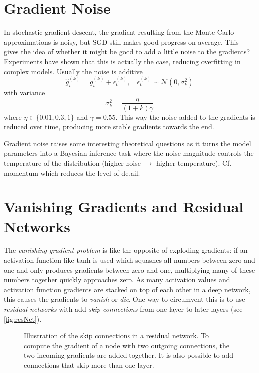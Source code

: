 	\section{Gradient Noise}
		In stochastic gradient descent, the gradient resulting from the Monte Carlo approximations is noisy, but SGD still makes good progress on average. This gives the idea of whether it might be good to add a little noise to the gradients? Experiments have shown that this is actually the case, reducing overfitting in complex models. Usually the noise is additive
		\begin{equation}
			\hat{g}_i^{(k)} = g_i^{(k)} + \epsilon_t^{(k)},\quad \epsilon_t^{(k)} \sim \mathcal{N}(0, \sigma_k^2)
		\end{equation}
		with variance
		\begin{equation}
			\sigma_k^2 = \frac{\eta}{(1 + k) \gamma}
		\end{equation}
		where \( \eta \in \{ 0.01, 0.3, 1 \} \) and \( \gamma = 0.55 \). This way the noise added to the gradients is reduced over time, producing more stable gradients towards the end.

		Gradient noise raises some interesting theoretical questions as it turns the model parameters into a Bayesian inference task where the noise magnitude controls the temperature of the distribution (higher noise \(\to\) higher temperature). Cf. momentum which reduces the level of detail.

	\section{Vanishing Gradients and Residual Networks}
		The \emph{vanishing gradient problem} is like the opposite of exploding gradients: if an activation function like tanh is used which squashes all numbers between zero and one and only produces gradients between zero and one, multiplying many of these numbers together quickly approaches zero. As many activation values and activation function gradients are stacked on top of each other in a deep network, this causes the gradients to \emph{vanish} or \emph{die}. One way to circumvent this is to use \emph{residual networks} with add \emph{skip connections} from one layer to later layers (see \autoref{fig:resNet}).

		\begin{figure}
			\centering
			\caption{Illustration of the skip connections in a residual network. To compute the gradient of a node with two outgoing connections, the two incoming gradients are added together. It is also possible to add connections that skip more than one layer.}
			\label{fig:resNet}
		\end{figure}


